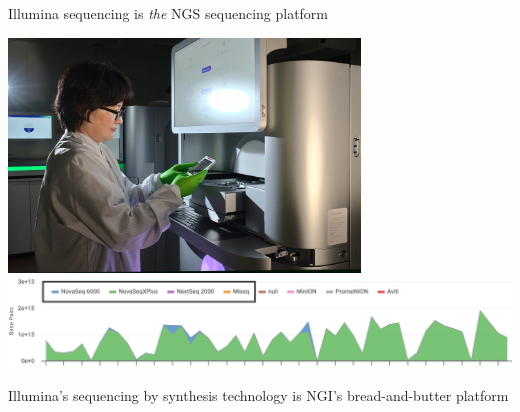\documentclass[10pt]{beamer}
\newcommand{\creditleft}[1]{{\vspace{\fill} \par \raggedright \scriptsize \mdseries \color{mDarkBrown} #1 \par}}
\begin{document}
\begin{frame}{Illumina sequencing is \emph{the} NGS sequencing platform}
	\begin{center}
		\includegraphics[width=0.7\textwidth]{./figures/ngi-choi-novaseqxplus.jpg} \\
		\hspace*{-1cm}
		\includegraphics[width=1.2\textwidth]{./figures/ngis-throughput-2024-illumina.png}
	\end{center}
\creditleft{Illumina's sequencing by synthesis technology is NGI's bread-and-butter platform}
\end{frame}
\end{document}
